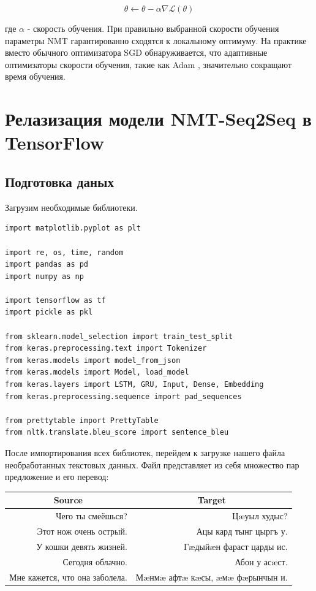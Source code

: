     $$
        \theta \leftarrow \theta - \alpha \nabla \mathscr{L}(\theta)
    $$
    
    где $\alpha$ - скорость обучения. При правильно выбранной скорости обучения параметры NMT гарантированно сходятся к локальному оптимуму. На практике вместо обычного оптимизатора SGD обнаруживается, что адаптивные оптимизаторы скорости обучения, такие как Adam \cite{14}, значительно сокращают время обучения.
	
	\clearpage
	
	\section{Релазизация модели NMT-Seq2Seq в TensorFlow}
	
	\subsection{Подготовка даных}
	
	Загрузим необходимые библиотеки.
	
	\begin{lstlisting}[language=iPython]
import matplotlib.pyplot as plt

import re, os, time, random
import pandas as pd
import numpy as np

import tensorflow as tf
import pickle as pkl

from sklearn.model_selection import train_test_split
from keras.preprocessing.text import Tokenizer
from keras.models import model_from_json
from keras.models import Model, load_model
from keras.layers import LSTM, GRU, Input, Dense, Embedding
from keras.preprocessing.sequence import pad_sequences

from prettytable import PrettyTable
from nltk.translate.bleu_score import sentence_bleu \end{lstlisting}
	
	После импортирования всех библиотек, перейдем к загрузке нашего файла необработанных текстовых данных. Файл представляет из себя множество пар предложение и его перевод:
	
\begin{table}[h]
    \begin{tabular}{|r|r|}
        \hline
        \multicolumn{1}{|c|}{\textbf{Source}} & \multicolumn{1}{c|}{\textbf{Target}} \\ \hline
        Чего ты смеёшься?                     & Цæуыл худыс?                         \\ \hline
        Этот нож очень острый.                & Ацы кард тынг цыргъ у.               \\ \hline
        У кошки девять жизней.                & Гæдыйæн фараст царды ис.             \\ \hline
        Сегодня облачно.                      & Абон у асæст.                        \\ \hline
        Мне кажется, что она заболела.        & Мæнмæ афтæ кæсы, æмæ фæрынчын и.     \\ \hline
    \end{tabular}
\end{table}
	
